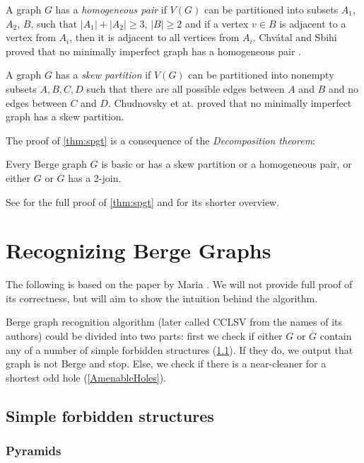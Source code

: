 A graph $G$ has a \emph{homogeneous pair} if $V(G)$ can be partitioned into subsets $A_1$, $A_2$, $B$, such that $|A_1|+|A_2| \geq 3$, $|B| \geq 2$ and if a vertex $v \in B$ is adjacent to a vertex from $A_i$, then it is adjacent to all vertices from $A_i$. Chvátal and Sbihi proved that no minimally imperfect graph has a homogeneous pair \cite{Chvtal1987}.

A graph $G$ has a \emph{skew partition} if $V(G)$ can be partitioned into nonempty subsets $A, B, C, D$ such that there are all possible edges between $A$ and $B$ and no edges between $C$ and $D$. Chudnovsky et at. proved that no minimally imperfect graph has a skew partition.

The proof of \cref{thm:spgt} is a consequence of the \emph{Decomposition theorem}:
\begin{theorem}
	\label{thm:decomposition}
	Every Berge graph $G$ is basic or has a skew partition or a homogeneous pair, or either $G$ or $\overline{G}$ has a 2-join.
\end{theorem}

See \cite{MC06} for the full proof of \cref{thm:spgt} and \cite{GC03} for its shorter overview.

\section{Recognizing Berge Graphs}
\label{sec:recognizingBerge}

The following is based on the paper by Maria \citeauthor{MC05}  \cite{MC05}. We will not provide full proof of its correctness, but will aim to show the intuition behind the algorithm.

Berge graph recognition algorithm (later called CCLSV from the names of its authors) could be divided into two parts: first we check if either $G$ or $\overline{G}$ contain any of a number of simple forbidden structures (\cref{SimpleStructures}). If they do, we output that graph is not Berge and stop. Else, we check if there is a near-cleaner for a shortest odd hole (\cref{AmenableHoles}).

\subsection{Simple forbidden structures}
\label{SimpleStructures}

\subsubsection{Pyramids}

